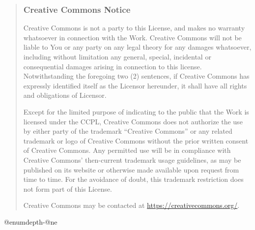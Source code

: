 \begin{quotation}
\subsubsection{Creative Commons Notice}
\par Creative Commons is not a party to this License, and
makes no warranty whatsoever in connection with the Work.
Creative Commons will not be liable to You or any party
on any legal theory for any damages whatsoever, including
without limitation any general, special, incidental or
consequential damages arising in connection to this
license. Notwithstanding the foregoing two (2) sentences,
if Creative Commons has expressly identified itself as
the Licensor hereunder, it shall have all rights and
obligations of Licensor.
\par Except for the limited purpose of indicating to the
public that the Work is licensed under the CCPL, Creative
Commons does not authorize the use by either party of the
trademark ``Creative Commons'' or any related trademark or
logo of Creative Commons without the prior written
consent of Creative Commons. Any permitted use will be in
compliance with Creative Commons' then-current trademark
usage guidelines, as may be published on its website or
otherwise made available upon request from time to time.
For the avoidance of doubt, this trademark restriction
does not form part of this License.
\par Creative Commons may be contacted at \url{https://creativecommons.org/}.
\end{quotation}



\advance\csname @enumdepth\endcsname-\csname @ne\endcsname
